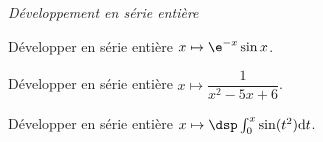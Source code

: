 \documentclass[a4paper,10pt]{report}
\begin{document}
\medskip

\begin{center}
\textit{{ {\large Développement en série entière}}}
\end{center}

\medskip

\begin{Exercice}{} Développer en série entière $x \mapsto \e^{-x}\sin x$.
\end{Exercice}


\begin{Exercice}{} Développer en série entière $x \mapsto \dfrac{1}{x^2-5x+6}$.
\end{Exercice}


\begin{Exercice}{} Développer en série entière $x \mapsto \dsp\int_0^x\sin(t^2)\mathrm{d}t$.
\end{Exercice}
\end{document}
